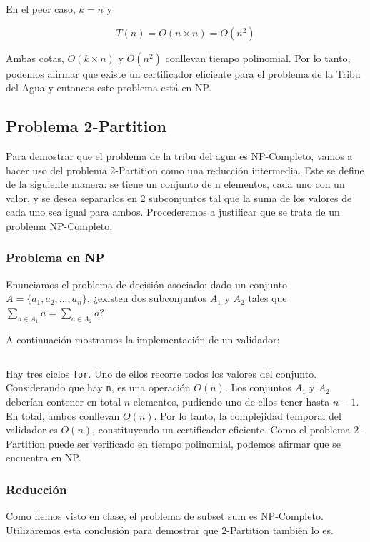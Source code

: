 \documentclass{article}
\begin{document}
En el peor caso, $k = n$ y

$$
T(n) = O(n \times n) = O(n^2)
$$

Ambas cotas, $O(k \times n)$ y $O(n^2)$ conllevan tiempo polinomial. Por lo tanto, podemos afirmar que existe un certificador eficiente para el problema de la Tribu del Agua y entonces este problema está en NP.

\subsection{Problema 2-Partition}
\label{subsec:partition}

Para demostrar que el problema de la tribu del agua es NP-Completo, vamos a hacer uso del problema 2-Partition como una reducción intermedia. Este se define de la siguiente manera: se tiene un conjunto de n elementos, cada uno con un valor, y se desea separarlos en 2 subconjuntos tal que la suma de los valores de cada uno sea igual para ambos. Procederemos a justificar que se trata de un problema NP-Completo.

\subsubsection{Problema en NP}
Enunciamos el problema de decisión asociado: dado un conjunto \( A =\{a_1, a_2, \ldots, a_n\} \), ¿existen dos subconjuntos \( A_1 \) y \( A_2 \) tales que \( \sum_{a \in A_1} a = \sum_{a \in A_2} a \)?

A continuación mostramos la implementación de un validador:
\inputminted[linenos]{python}{codigo/certificador_2_partition.py}

Hay tres ciclos \texttt{for}. Uno de ellos recorre todos los valores del conjunto. Considerando que hay \texttt{n}, es una operación $O(n)$. Los conjuntos $A_1$ y $A_2$ deberían contener en total $n$ elementos, pudiendo uno de ellos tener hasta  $n-1$. En total, ambos conllevan $O(n)$. Por lo tanto, la complejidad temporal del validador es $O(n)$, constituyendo un certificador eficiente. Como el problema 2-Partition puede ser verificado en tiempo polinomial, podemos afirmar que se encuentra en NP.

\subsubsection{Reducción}
\label{sec:np-completo-2p}

Como hemos visto en clase, el problema de subset sum es NP-Completo. Utilizaremos esta conclusión para demostrar que 2-Partition también lo es.
\end{document}
